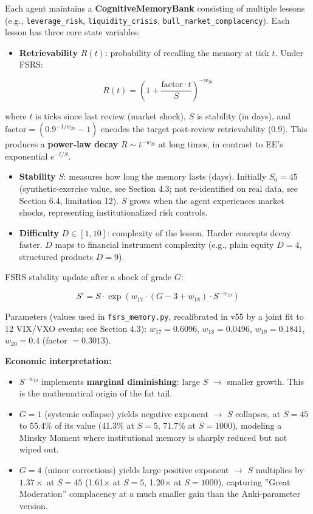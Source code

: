 \documentclass[11pt]{article}
\begin{document}
Each agent maintains a \textbf{CognitiveMemoryBank} consisting of multiple lessons (e.g., \texttt{leverage\_risk}, \texttt{liquidity\_crisis}, \texttt{bull\_market\_complacency}). Each lesson has three core state variables:

\begin{itemize}
\item \textbf{Retrievability} $R(t)$: probability of recalling the memory at tick $t$. Under FSRS:
\end{itemize}

\[
R(t) = \left(1 + \frac{\text{factor} \cdot t}{S}\right)^{-w_{20}}
\]

where $t$ is ticks since last review (market shock), $S$ is stability (in days), and $\text{factor} = (0.9^{-1/w_{20}} - 1)$ encodes the target post-review retrievability (0.9). This produces a \textbf{power-law decay} $R \sim t^{-w_{20}}$ at long times, in contrast to EE's exponential $e^{-t/S}$.

\begin{itemize}
\item \textbf{Stability} $S$: measures how long the memory lasts (days). Initially $S_0 = 45$ (synthetic-exercise value, see Section 4.3; not re-identified on real data, see Section 6.4, limitation 12). $S$ grows when the agent experiences market shocks, representing institutionalized risk controls.
\end{itemize}

\begin{itemize}
\item \textbf{Difficulty} $D \in [1,10]$: complexity of the lesson. Harder concepts decay faster. $D$ maps to financial instrument complexity (e.g., plain equity $D=4$, structured products $D=9$).
\end{itemize}

FSRS stability update after a shock of grade $G$:

\[
S' = S \cdot \exp\left( w_{17} \cdot (G - 3 + w_{18}) \cdot S^{-w_{19}} \right)
\]

Parameters (values used in \texttt{fsrs\_memory.py}, recalibrated in v55 by a joint fit to 12 VIX/VXO events; see Section 4.3): $w_{17}=0.6096$, $w_{18}=0.0496$, $w_{19}=0.1841$, $w_{20}=0.4$ (factor $= 0.3013$).

\textbf{Economic interpretation:}

\begin{itemize}
\item $S^{-w_{19}}$ implements \textbf{marginal diminishing}: large $S$ $\rightarrow$ smaller growth. This is the mathematical origin of the fat tail.
\item $G=1$ (systemic collapse) yields negative exponent $\rightarrow$ $S$ collapses, at $S=45$ to 55.4\% of its value (41.3\% at $S=5$, 71.7\% at $S=1000$), modeling a Minsky Moment where institutional memory is sharply reduced but not wiped out.
\item $G=4$ (minor corrections) yields large positive exponent $\rightarrow$ $S$ multiplies by $1.37\times$ at $S=45$ (1.61$\times$ at $S=5$, 1.20$\times$ at $S=1000$), capturing ''Great Moderation'' complacency at a much smaller gain than the Anki-parameter version.
\end{itemize}
\end{document}
